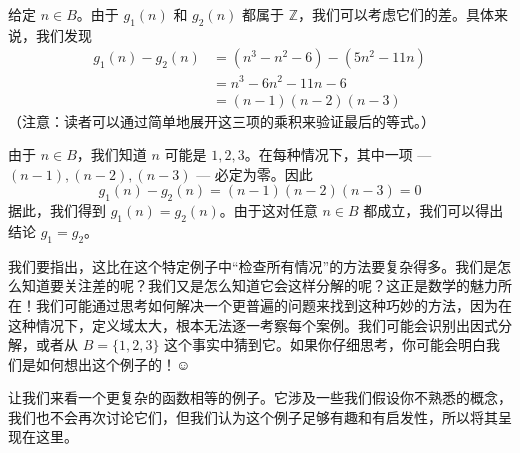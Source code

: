 给定 $n \in B$。由于 $g_1(n)$ 和 $g_2(n)$ 都属于 $\mathbb{Z}$，我们可以考虑它们的差。具体来说，我们发现
\begin{align*}
    g_1(n) - g_2(n) &= (n^3 - n^2 - 6) - (5n^2 - 11n) \\
    &= n^3 - 6n^2 - 11n - 6 \\
    &= (n - 1)(n - 2)(n - 3)
\end{align*}
（注意：读者可以通过简单地展开这三项的乘积来验证最后的等式。）

由于 $n \in B$，我们知道 $n$ 可能是 $1,2,3$。在每种情况下，其中一项 --- $(n - 1), (n - 2), (n - 3)$ --- 必定为零。因此
\[g_1(n) - g_2(n) = (n - 1)(n - 2)(n - 3) = 0\]
据此，我们得到 $g_1(n) = g_2(n)$。由于这对任意 $n \in B$ 都成立，我们可以得出结论 $g_1 = g_2$。

我们要指出，这比在这个特定例子中``检查所有情况''的方法要复杂得多。我们是怎么知道要关注差的呢？我们又是怎么知道它会这样分解的呢？这正是数学的魅力所在！我们可能通过思考如何解决一个更普遍的问题来找到这种巧妙的方法，因为在这种情况下，定义域太大，根本无法逐一考察每个案例。我们可能会识别出因式分解，或者从 $B = \{1, 2, 3\}$ 这个事实中猜到它。如果你仔细思考，你可能会明白我们是如何想出这个例子的！$\smiley{}$

让我们来看一个更复杂的函数相等的例子。它涉及一些我们假设你不熟悉的概念，我们也不会再次讨论它们，但我们认为这个例子足够有趣和有启发性，所以将其呈现在这里。\\

